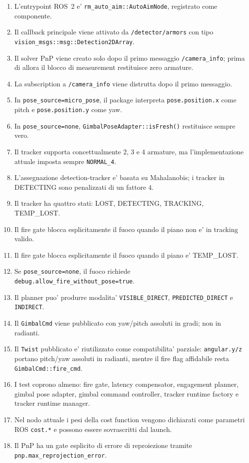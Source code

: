 \documentclass[11pt,a4paper]{article}
\newcommand{\code}[1]{\texttt{#1}}
\newcommand{\topic}[1]{\texttt{#1}}
\begin{document}
\begin{enumerate}[leftmargin=1.4em]
  \item L'entrypoint ROS~2 e' \code{rm\_auto\_aim::AutoAimNode}, registrato come componente.
  \item Il callback principale viene attivato da \topic{/detector/armors} con tipo \code{vision\_msgs::msg::Detection2DArray}.
  \item Il solver PnP viene creato solo dopo il primo messaggio \topic{/camera_info}; prima di allora il blocco di measurement restituisce zero armature.
  \item La subscription a \topic{/camera_info} viene distrutta dopo il primo messaggio.
  \item In \code{pose\_source=micro\_pose}, il package interpreta \code{pose.position.x} come pitch e \code{pose.position.y} come yaw.
  \item In \code{pose\_source=none}, \code{GimbalPoseAdapter::isFresh()} restituisce sempre vero.
  \item Il tracker supporta concettualmente 2, 3 e 4 armature, ma l'implementazione attuale imposta sempre \code{NORMAL\_4}.
  \item L'assegnazione detection-tracker e' basata su Mahalanobis; i tracker in DETECTING sono penalizzati di un fattore \(4\).
  \item Il tracker ha quattro stati: LOST, DETECTING, TRACKING, TEMP\_LOST.
  \item Il fire gate blocca esplicitamente il fuoco quando il piano non e' in tracking valido.
  \item Il fire gate blocca esplicitamente il fuoco quando il piano e' TEMP\_LOST.
  \item Se \code{pose\_source=none}, il fuoco richiede \code{debug.allow\_fire\_without\_pose=true}.
  \item Il planner puo' produrre modalita' \code{VISIBLE\_DIRECT}, \code{PREDICTED\_DIRECT} e \code{INDIRECT}.
  \item Il \code{GimbalCmd} viene pubblicato con yaw/pitch assoluti in gradi; non in radianti.
  \item Il \code{Twist} pubblicato e' riutilizzato come compatibilita' parziale: \code{angular.y/z} portano pitch/yaw assoluti in radianti, mentre il fire flag affidabile resta \code{GimbalCmd::fire\_cmd}.
  \item I test coprono almeno: fire gate, latency compensator, engagement planner, gimbal pose adapter, gimbal command controller, tracker runtime factory e tracker runtime manager.
  \item Nel nodo attuale i pesi della cost function vengono dichiarati come parametri ROS \code{cost.*} e possono essere sovrascritti dal launch.
  \item Il PnP ha un gate esplicito di errore di reproiezione tramite \code{pnp.max\_reprojection\_error}.
\end{enumerate}
\end{document}
